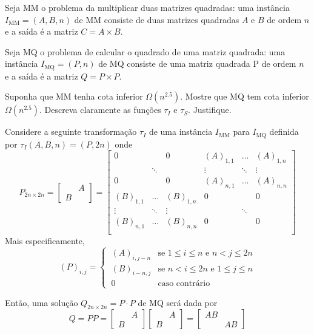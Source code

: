 Seja MM o problema da multiplicar duas matrizes quadradas: uma instância $I_\text{MM} = (A,B,n)$ de MM consiste de duas matrizes quadradas $A$ e $B$ de ordem $n$ e a saída é a matriz $C = A \times B$.

Seja MQ o problema de calcular o quadrado de uma matriz quadrada: uma instância $I_\text{MQ} = (P,n)$ de MQ consiste de uma matriz quadrada P de ordem $n$ e a saída é a matriz $Q = P \times P$.

Suponha que MM tenha cota inferior $\Omega\left(n^{2.5}\right)$. Mostre que MQ tem cota inferior $\Omega\left(n^{2.5}\right)$. Descreva claramente as funções $\tau_I$ e $\tau_S$. Justifique.

\itemdsep

Considere a seguinte transformação $\tau_I$ de uma instância $I_\text{MM}$ para $I_\text{MQ}$ definida por $\tau_I(A, B, n) = (P, 2n)$ onde
\[
    P_{2n \times 2n} = \begin{bmatrix} & A \\ B & \end{bmatrix}
    = \begin{bmatrix}
        0         &        & 0         & (A)_{1,1} & \dots  & (A)_{1,n} \\
                    & \ddots &           & \vdots    & \ddots & \vdots    \\
        0         &        & 0         & (A)_{n,1} & \dots  & (A)_{n,n} \\
        (B)_{1,1} & \dots  & (B)_{1,n} & 0         &        & 0         \\
        \vdots    & \ddots & \vdots    &           & \ddots &           \\
        (B)_{n,1} & \dots  & (B)_{n,n} & 0         &        & 0         \\
    \end{bmatrix}
\]
Mais especificamente,
\[
    (P)_{i,j} = \begin{cases}
        ~ (A)_{i,j-n} & \text{se $1 \leq i \leq n$ e $n < j \leq 2 n$} \\
        ~ (B)_{i-n,j} & \text{se $n < i \leq 2 n$ e $1 \leq j \leq n$}\\
        ~ 0 & \text{caso contrário}
    \end{cases}
\]

Então, uma solução $Q_{2n \times 2n} = P \cdot P$ de MQ será dada por
\[
    Q = P P
    = \begin{bmatrix} & A \\ B & \end{bmatrix} \begin{bmatrix} & A \\ B & \end{bmatrix}
    = \begin{bmatrix} A B & \\ & A B \end{bmatrix}
\]

